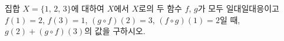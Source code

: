 집합 $X=\{1,\,2,\,3\}$에 대하여 $X$에서 $X$로의 두 함수 $f$, $g$가 모두 일대일대응이고 $f(1)=2$, $f(3)=1$, $(g\circ f)(2)=3$, $(f\circ g)(1)=2$일 때, $g(2)+(g\circ f)(3)$의 값을 구하시오.
